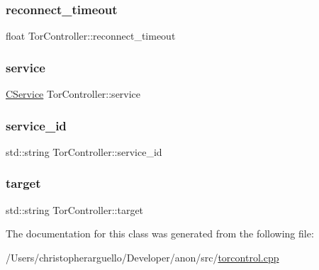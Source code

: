 \subsubsection{\texorpdfstring{reconnect\+\_\+timeout}{reconnect\_timeout}}
{\footnotesize\ttfamily float Tor\+Controller\+::reconnect\+\_\+timeout\hspace{0.3cm}{\ttfamily [private]}}

\mbox{\label{class_tor_controller_aa460dee5c02e036c6784f64b4a3634e3}} 
\subsubsection{\texorpdfstring{service}{service}}
{\footnotesize\ttfamily \mbox{\hyperlink{class_c_service}{C\+Service}} Tor\+Controller\+::service\hspace{0.3cm}{\ttfamily [private]}}

\mbox{\label{class_tor_controller_a471e6bcf2090fd772503d22f3e028968}} 
\subsubsection{\texorpdfstring{service\+\_\+id}{service\_id}}
{\footnotesize\ttfamily std\+::string Tor\+Controller\+::service\+\_\+id\hspace{0.3cm}{\ttfamily [private]}}

\mbox{\label{class_tor_controller_ae082deff33f6f1db7e51825113c1adab}} 
\subsubsection{\texorpdfstring{target}{target}}
{\footnotesize\ttfamily std\+::string Tor\+Controller\+::target\hspace{0.3cm}{\ttfamily [private]}}



The documentation for this class was generated from the following file\+:\begin{DoxyCompactItemize}
\item 
/\+Users/christopherarguello/\+Developer/anon/src/\mbox{\hyperlink{torcontrol_8cpp}{torcontrol.\+cpp}}\end{DoxyCompactItemize}
